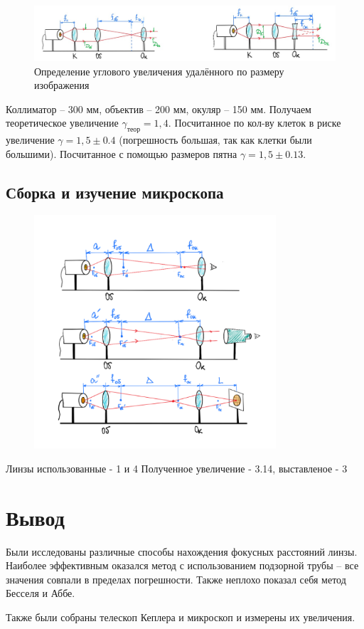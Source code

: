 \documentclass[a4paper,12pt]{article}
\theoremstyle{definition}
\begin{document}
\begin{figure}[h!]
    \centering
    \includegraphics[width=18cm]{8.jpg}
    \caption{Определение углового увеличения удалённого по размеру изображения}\label{pic:8}
\end{figure}

Коллиматор -- 300 мм, объектив -- 200 мм, окуляр -- 150 мм.  Получаем теоретическое увеличение $\gamma_\text{теор} = 1,4$. Посчитанное по кол-ву клеток в риске увеличение $\gamma = 1,5 \pm 0.4$ (погрешность большая, так как клетки были большими). Посчитанное с помощью размеров пятна $\gamma = 1,5 \pm 0.13$.

\newpage
\subsection{Сборка и изучение микроскопа}

\begin{figure}[h!]
    \centering
    \includegraphics[width=9cm]{image.png}
    \caption{}\label{pic:45}
\end{figure}
Линзы использованные - 1 и 4
Полученное увеличение - 3.14, выставленое - 3


\section{Вывод}

Были исследованы различные способы нахождения фокусных расстояний линзы. Наиболее эффективным оказался метод с использованием подзорной трубы -- все значения совпали в пределах погрешности. Также неплохо показал себя метод Бесселя и Аббе.

Также были собраны телескоп Кеплера и микроскоп и измерены их увеличения.
\end{document}
